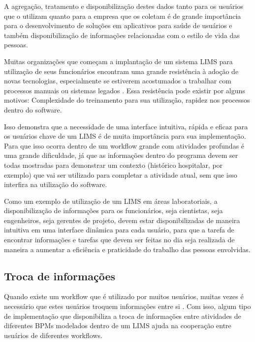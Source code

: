A agregação, tratamento e disponibilização destes dados tanto para os usuários que o utilizam quanto para a empresa que os coletam é de grande importância para o desenvolvimento de soluções em aplicativos para saúde de usuários e também disponibilização de informações relacionadas com o estilo de vida das pessoas.


Muitas organizações que começam a implantação de um sistema LIMS para utilização de seus funcionários encontram uma grande resistência à adoção de novas tecnologias, especialmente se estiverem acostumados a trabalhar com processos manuais ou sistemas legados \R. Essa resistência pode existir por alguns motivos: Complexidade do treinamento para sua utilização, rapidez nos processos dentro do software.

Isso demonstra que a necessidade de uma interface intuitiva, rápida e eficaz para os usuários chave de um LIMS é de muita importância para sua implementação. Para que isso ocorra dentro de um workflow grande com atividades profundas é uma grande dificuldade, já que as informações dentro do programa devem ser todas mostradas para demonstrar um contexto (histórico hospitalar, por exemplo) que vai ser utilizado para completar a atividade atual, sem que isso interfira na utilização do software.


Como um exemplo de utilização de um LIMS em áreas laboratoriais, a disponibilização de informações para os funcionários, seja cientistas, seja engenheiros, seja gerentes de projeto, devem estar disponibilizadas de maneira intuitiva em uma interface dinâmica para cada usuário, para que a tarefa de encontrar informações e tarefas que devem ser feitas no dia seja realizada de maneira a aumentar a eficiência e praticidade do trabalho das pessoas envolvidas.

\subsection{Troca de informações}


Quando existe um workflow que é utilizado por muitos usuários, muitas vezes é necessário que estes usuários troquem informações entre si \R. Com isso, algum tipo de implementação que disponibiliza a troca de informações entre atividades de diferentes BPMs modelados dentro de um LIMS ajuda na cooperação entre usuários de diferentes workflows.

